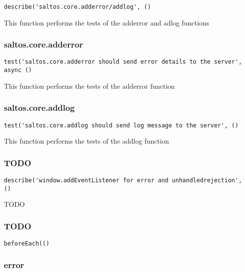 \documentclass[a4paper]{article}
\begin{document}
\begin{lstlisting}
describe('saltos.core.adderror/addlog', ()
\end{lstlisting}

This function performs the tests of the adderror and adlog functions

\hypertarget{toc485}{}
\subsubsection{saltos.core.adderror}

\begin{lstlisting}
test('saltos.core.adderror should send error details to the server', async ()
\end{lstlisting}

This function performs the tests of the adderror function

\hypertarget{toc486}{}
\subsubsection{saltos.core.addlog}

\begin{lstlisting}
test('saltos.core.addlog should send log message to the server', ()
\end{lstlisting}

This function performs the tests of the addlog function

\hypertarget{toc487}{}
\subsubsection{TODO}

\begin{lstlisting}
describe('window.addEventListener for error and unhandledrejection', ()
\end{lstlisting}

TODO

\hypertarget{toc488}{}
\subsubsection{TODO}

\begin{lstlisting}
beforeEach(()
\end{lstlisting}

\hypertarget{toc489}{}
\subsubsection{error}
\end{document}
